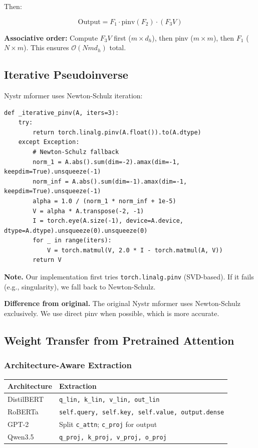 Then:

\[
\text{Output} = F_1 \cdot \text{pinv}(F_2) \cdot (F_3 V)
\tag{4.3}
\]

\textbf{Associative order:} Compute $F_3 V$ first ($m \times d_h$), then pinv 
($m \times m$), then $F_1$ ($N \times m$). This ensures $\mathcal{O}(N m d_h)$ 
total.

\subsection{Iterative Pseudoinverse}

Nystr mformer uses Newton-Schulz iteration:

\begin{lstlisting}
def _iterative_pinv(A, iters=3):
    try:
        return torch.linalg.pinv(A.float()).to(A.dtype)
    except Exception:
        # Newton-Schulz fallback
        norm_1 = A.abs().sum(dim=-2).amax(dim=-1, keepdim=True).unsqueeze(-1)
        norm_inf = A.abs().sum(dim=-1).amax(dim=-1, keepdim=True).unsqueeze(-1)
        alpha = 1.0 / (norm_1 * norm_inf + 1e-5)
        V = alpha * A.transpose(-2, -1)
        I = torch.eye(A.size(-1), device=A.device, dtype=A.dtype).unsqueeze(0).unsqueeze(0)
        for _ in range(iters):
            V = torch.matmul(V, 2.0 * I - torch.matmul(A, V))
        return V
\end{lstlisting}

\textbf{Note.} Our implementation first tries \texttt{torch.linalg.pinv} (SVD-based). 
If it fails (e.g., singularity), we fall back to Newton-Schulz.

\textbf{Difference from original.} The original Nystr mformer uses Newton-Schulz 
exclusively. We use direct pinv when possible, which is more accurate.

\subsection{Weight Transfer from Pretrained Attention}

\subsubsection{Architecture-Aware Extraction}

\begin{table}[H]
\centering
\small
\begin{tabular}{ll}
\toprule
\textbf{Architecture} & \textbf{Extraction} \\
\midrule
DistilBERT & \texttt{q\_lin, k\_lin, v\_lin, out\_lin} \\
RoBERTa & \texttt{self.query, self.key, self.value, output.dense} \\
GPT-2 & Split \texttt{c\_attn}; \texttt{c\_proj} for output \\
Qwen3.5 & \texttt{q\_proj, k\_proj, v\_proj, o\_proj} \\
\bottomrule
\end{tabular}
\end{table}

